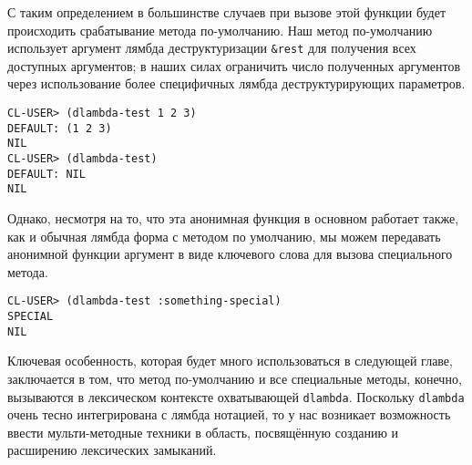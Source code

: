 С таким определением в большинстве случаев при вызове этой функции будет происходить срабатывание метода по-умолчанию. Наш метод по-умолчанию использует аргумент лямбда деструктуризации \verb"&rest" для получения всех доступных аргументов; в наших силах ограничить число полученных аргументов через использование более специфичных лямбда деструктурирующих параметров.

\begin{verbatim}
CL-USER> (dlambda-test 1 2 3)
DEFAULT: (1 2 3)
NIL
CL-USER> (dlambda-test)
DEFAULT: NIL
NIL
\end{verbatim}

Однако, несмотря на то, что эта анонимная функция в основном работает также, как и обычная лямбда форма с методом по умолчанию, мы можем передавать анонимной функции аргумент в виде ключевого слова для вызова специального метода.

\begin{verbatim}
CL-USER> (dlambda-test :something-special)
SPECIAL
NIL
\end{verbatim}

Ключевая особенность, которая будет много использоваться в следующей главе, заключается в том, что метод по-умолчанию и все специальные методы, конечно, вызываются в лексическом контексте охватывающей \verb"dlambda". Поскольку \verb"dlambda" очень тесно интегрирована с лямбда нотацией, то у нас возникает возможность ввести мульти-методные техники в область, посвящённую созданию и расширению лексических замыканий.

